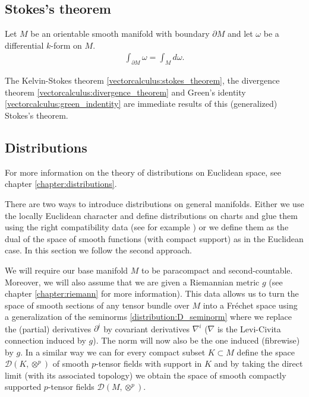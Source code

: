 \subsection{Stokes's theorem}

    \begin{theorem}
        \label{forms:theorem:stokes_theorem}
        Let $M$ be an orientable smooth manifold with boundary $\partial M$ and let $\omega$ be a differential $k$-form on $M$.
        \begin{gather}
            \int_{\partial M}\omega = \int_M d\omega.
        \end{gather}
    \end{theorem}
    \begin{result}
        The Kelvin-Stokes theorem \ref{vectorcalculus:stokes_theorem}, the divergence theorem \ref{vectorcalculus:divergence_theorem} and Green's identity \ref{vectorcalculus:green_indentity} are immediate results of this (generalized) Stokes's theorem.
    \end{result}

\subsection{Distributions}

    For more information on the theory of distributions on Euclidean space, see chapter \ref{chapter:distributions}.

    There are two ways to introduce distributions on general manifolds. Either we use the locally Euclidean character and define distributions on charts and glue them using the right compatibility data (see for example \cite{AMP1}) or we define them as the dual of the space of smooth functions (with compact support) as in the Euclidean case. In this section we follow the second approach.

    We will require our base manifold $M$ to be paracompact and second-countable. Moreover, we will also assume that we are given a Riemannian metric $g$ (see chapter \ref{chapter:riemann} for more information). This data allows us to turn the space of smooth sections of any tensor bundle over $M$ into a Fr\'echet space using a generalization of the seminorms \ref{distribution:D_seminorm} where we replace the (partial) derivatives $\partial^i$ by covariant derivatives $\nabla^i$ ($\nabla$ is the Levi-Civita connection induced by $g$). The norm will now also be the one induced (fibrewise) by $g$. In a similar way we can for every compact subset $K\subset M$ define the space $\mathcal{D}(K, \otimes^p)$ of smooth $p$-tensor fields with support in $K$ and by taking the direct limit (with its associated topology) we obtain the space of smooth compactly supported $p$-tensor fields $\mathcal{D}(M, \otimes^p)$.

